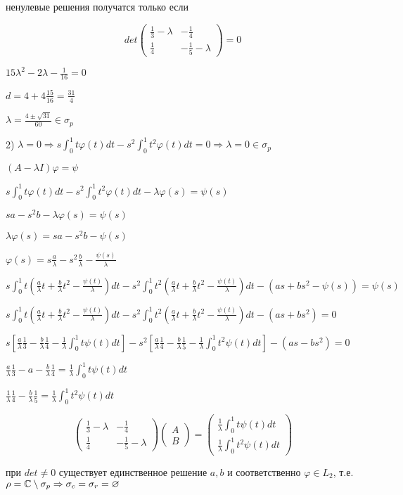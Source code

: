 \documentclass[russian]{article}
\begin{document}
ненулевые решения получатся только если

$$
det
\begin{pmatrix}
\frac{1}{3}-\lambda & -\frac{1}{4} \\
\frac{1}{4} & -\frac{1}{5}-\lambda
\end{pmatrix} 
=0
$$

$15 \lambda ^2 - 2 \lambda - \frac{1}{16} = 0$

$d = 4 + 4 \frac{15}{16} = \frac{31}{4}$

$\lambda = \frac{4 \pm \sqrt{31}}{60} \in \sigma_p$

2) $\lambda = 0 \Rightarrow s\int_0^1t\varphi(t)dt - s^2 \int _0 ^1 t^2 \varphi (t) dt = 0 \Rightarrow \lambda = 0 \in \sigma _p$

$(A-\lambda I)\varphi = \psi$

$s\int_0^1t\varphi(t)dt - s^2 \int_0^1t^2\varphi(t)dt - \lambda \varphi(s)= \psi(s)$

$s a - s^2 b - \lambda \varphi(s)= \psi(s)$

$\lambda \varphi(s) = s a - s^2 b - \psi(s)$

$\varphi(s) = s \frac{a}{\lambda} - s^2 \frac{b}{\lambda} - \frac{\psi(s)}{\lambda}$

$s\int_0^1t(\frac{a}{\lambda} t + \frac{b}{\lambda}t^2 - \frac{\psi(t)}{\lambda})dt - s^2 \int _0^1 t^2(\frac{a}{\lambda} t + \frac{b}{\lambda}t^2 - \frac{\psi(t)}{\lambda})dt - (a s + b s^2 - \psi(s)) = \psi(s)$

$s\int_0^1t(\frac{a}{\lambda} t + \frac{b}{\lambda}t^2 - \frac{\psi(t)}{\lambda})dt - s^2 \int _0^1 t^2(\frac{a}{\lambda} t + \frac{b}{\lambda}t^2 - \frac{\psi(t)}{\lambda})dt - (a s + b s^2) = 0$

$s[\frac{a}{\lambda}\frac{1}{3}-\frac{b}{\lambda}\frac{1}{4} - \frac{1}{\lambda}\int_0^1t\psi(t)dt] - s^2[\frac{a}{\lambda}\frac{1}{4}-\frac{b}{\lambda}\frac{1}{5} - \frac{1}{\lambda}\int_0^1 t^2\psi(t) dt] - (a s - b s ^ 2) = 0$

$\frac{a}{\lambda}\frac{1}{3} - a - \frac{b}{\lambda}\frac{1}{4} = \frac{1}{\lambda}\int_0^1 t \psi (t) dt$

$\frac{1}{\lambda}\frac{1}{4} - \frac{b}{\lambda}\frac{1}{5} = \frac{1}{\lambda}\int_0^1t^2 \psi(t) dt$

\begin{equation*}
\begin{pmatrix}
\frac{1}{3}-\lambda & -\frac{1}{4} \\
\frac{1}{4} & -\frac{1}{5}-\lambda
\end{pmatrix} 
\begin{pmatrix}
A \\
B
\end{pmatrix}
=
\begin{pmatrix}
\frac{1}{\lambda}\int_0^1 t \psi (t) dt \\
\frac{1}{\lambda}\int_0^1 t^2 \psi(t) dt
\end{pmatrix}
\end{equation*}

при $det \ne 0$ существует единственное решение $a,b$ и соответственно $\varphi \in L_2$, т.е. $\rho = \Bbb C \setminus \sigma_p \Rightarrow \sigma_c = \sigma_r = \varnothing$
\end{document}
